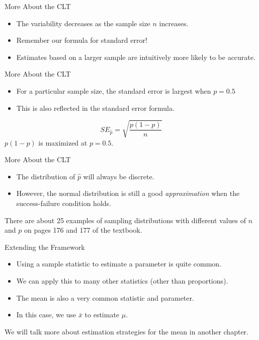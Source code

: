 \begin{frame}{More About the CLT}
    \begin{itemize}
        \item The variability decreases as the sample size $n$ increases.
        \item Remember our formula for standard error!
        \item Estimates based on a larger sample are intuitively more likely to be accurate.
    \end{itemize}
\end{frame}

\begin{frame}{More About the CLT}
    \begin{itemize}
        \item For a particular sample size, the standard error is largest when $p=0.5$
        \item This is also reflected in the standard error formula.
    \end{itemize}
    \[
        SE_{\hat{p}} = \sqrt{\frac{p(1-p)}{n}}
    \]
    $p(1-p)$ is maximized at $p=0.5$.
\end{frame}

\begin{frame}{More About the CLT}
    \begin{itemize}
        \item The distribution of $\hat{p}$ will always be discrete.
        \item However, the normal distribution is still a good \textit{approximation} when the success-failure condition holds.
    \end{itemize}
    There are about 25 examples of sampling distributions with different values of $n$ and $p$ on pages 176 and 177 of the textbook.
\end{frame}

\begin{frame}{Extending the Framework}
    \begin{itemize}
        \item Using a sample statistic to estimate a parameter is quite common.
        \item We can apply this to many other statistics (other than proportions).
        \item The mean is also a very common statistic and parameter.
        \item In this case, we use $\bar{x}$ to estimate $\mu$.
    \end{itemize}
    We will talk more about estimation strategies for the mean in another chapter. 
\end{frame}